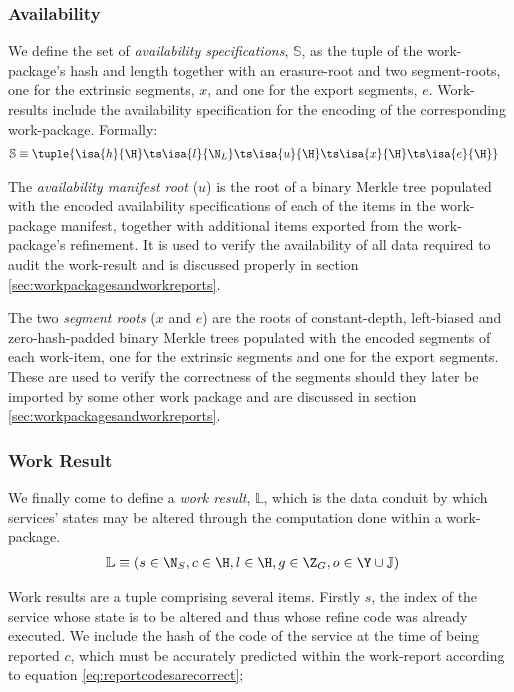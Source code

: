 \subsubsection{Availability}
We define the set of \emph{availability specifications}, $\mathbb{S}$, as the tuple of the work-package's hash and length together with an erasure-root and two segment-roots, one for the extrinsic segments, $x$, and one for the export segments, $e$. Work-results include the availability specification for the encoding of the corresponding work-package. Formally:
\begin{align}
  \mathbb{S} &\equiv \tuple{
    \isa{h}{\H}\ts
    \isa{l}{\N_L}\ts
    \isa{u}{\H}\ts
    \isa{x}{\H}\ts
    \isa{e}{\H}
  }
\end{align}

The \emph{availability manifest root} ($u$) is the root of a binary Merkle tree populated with the encoded availability specifications of each of the items in the work-package manifest, together with additional items exported from the work-package's refinement. It is used to verify the availability of all data required to audit the work-result and is discussed properly in section \ref{sec:workpackagesandworkreports}.

The two \emph{segment roots} ($x$ and $e$) are the roots of constant-depth, left-biased and zero-hash-padded binary Merkle trees populated with the encoded segments of each work-item, one for the extrinsic segments and one for the export segments. These are used to verify the correctness of the segments should they later be imported by some other work package and are discussed in section \ref{sec:workpackagesandworkreports}.

\subsubsection{Work Result}
We finally come to define a \emph{work result}, $\mathbb{L}$, which is the data conduit by which services' states may be altered through the computation done within a work-package.
\begin{align}\label{eq:workresult}
  \mathbb{L} &\equiv (s \in \N_S, c \in \H, l \in \H, g \in \Z_G, o \in \Y \cup \mathbb{J})
\end{align}

Work results are a tuple comprising several items. Firstly $s$, the index of the service whose state is to be altered and thus whose refine code was already executed. We include the hash of the code of the service at the time of being reported $c$, which must be accurately predicted within the work-report according to equation \ref{eq:reportcodesarecorrect};

